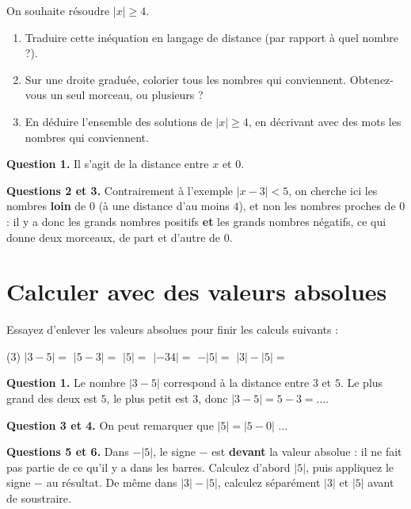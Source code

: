 \documentclass[10pt,a4paper]{article}
\begin{document}
\begin{exo}


    On souhaite résoudre \(|x|\geq 4\).
    \begin{enumerate}
        \item Traduire cette inéquation en langage de distance (par rapport à quel nombre ?).
        \item Sur une droite graduée, colorier tous les nombres qui conviennent. Obtenez-vous un seul morceau, ou plusieurs ?
        \item En déduire l'ensemble des solutions de \(|x|\geq 4\), en décrivant avec des mots les nombres qui conviennent.
    \end{enumerate}

    \begin{indication}
        \textbf{Question 1.} Il s'agit de la distance entre \(x\) et \(0\).

        \textbf{Questions 2 et 3.} Contrairement à l'exemple \(|x-3|<5\), on cherche ici les nombres \textbf{loin} de \(0\) (à une distance d'au moins \(4\)), et non les nombres proches de \(0\) : il y a donc les grands nombres positifs \textbf{et} les grands nombres négatifs, ce qui donne deux morceaux, de part et d'autre de \(0\).
    \end{indication}
\end{exo}

\section{Calculer avec des valeurs absolues}

\begin{exo}[][]
    Essayez d'enlever les valeurs absolues pour finir les calculs suivants :
    \begin{tasks}(3)
        \task[1.] \(|3-5| = \)
        \task[2.] \(|5-3| = \)
        \task[3.] \(|5| = \)
        \task[4.] \(|-34| = \)
        \task[5.] \(-|5| = \)
        \task[6.] \(|3|-|5| = \)
    \end{tasks}

    \begin{indication}
        \textbf{Question 1.} Le nombre \(|3-5|\) correspond à la distance entre \(3\) et \(5\). Le plus grand des deux est \(5\), le plus petit est \(3\), donc \(|3-5| = 5-3=\dots\).

        \textbf{Question 3 et 4.} On peut remarquer que \(|5| = |5-0|\) \(\dots\)

        \textbf{Questions 5 et 6.} Dans \(-|5|\), le signe \og \(-\) \fg{} est \textbf{devant} la valeur absolue : il ne fait pas partie de ce qu'il y a dans les barres. Calculez d'abord \(|5|\), puis appliquez le signe \(-\) au résultat. De même dans \(|3|-|5|\), calculez séparément \(|3|\) et \(|5|\) avant de soustraire.
    \end{indication}
\end{exo}
\end{document}
